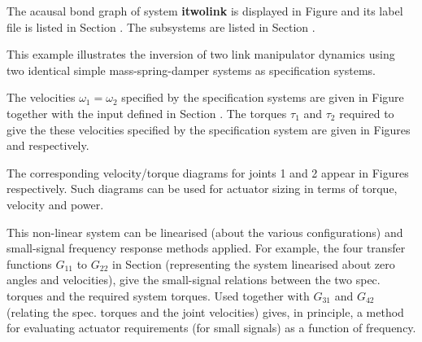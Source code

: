 
%

   The acausal bond graph of system \textbf{itwolink} is
   displayed in Figure  and its label
   file is listed in Section .
   The subsystems are listed in Section .

This example illustrates the inversion of  two link manipulator
dynamics using two identical  simple mass-spring-damper systems as
specification systems.

The velocities $\omega_1=\omega_2$ specified by the specification
systems are given in Figure 
together with the input defined in Section .
The torques $\tau_1$ and $\tau_2$ required to give the these
velocities specified by the specification system are given in Figures
 and
 respectively.

The corresponding velocity/torque diagrams for joints 1 and 2 appear in
Figures 
 respectively.
Such diagrams can be used for actuator sizing in terms of torque,
velocity and power.

 
This non-linear system can be linearised (about the various
configurations) and small-signal frequency response methods applied.
For example, the four transfer functions $G_11$ to $G_22$ in Section
 (representing the system linearised about zero
angles and velocities), give the small-signal relations between the
two spec. torques and the required system torques. Used together with
$G_31$ and $G_42$ (relating the spec. torques and the joint
velocities) gives, in principle, a method for evaluating actuator
requirements (for small signals) as a function of frequency.

